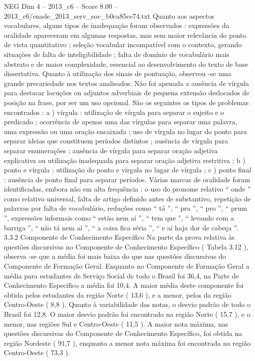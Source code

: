 \begin{textsample}{NEG Dim 4 – 2013\_c6 – Score 8.00 – 2013\_c6/enade\_2013\_serv\_soc\_b0ca85ce74.txt}
Quanto aos aspectos vocabulares, alguns tipos de inadequação foram observados : expressões da oralidade apareceram em algumas respostas, mas sem maior relevância do ponto de vista quantitativo ; seleção vocabular incompatível com o contexto, gerando situações de falta de inteligibilidade ; falta de domínio de vocabulário mais abstrato e de maior complexidade, essencial ao desenvolvimento do texto de base dissertativa.
Quanto à utilização dos sinais de pontuação, observou -se uma grande precariedade nos textos analisados.
Não foi apenada a ausência de vírgula para destacar locuções ou adjuntos adverbiais de pequena extensão deslocados de posição na frase, por ser um uso opcional.
São os seguintes os tipos de problemas encontrados : a ) vírgula : utilização de vírgula para separar o sujeito e o predicado ; ocorrência de apenas uma das vírgulas para separar uma palavra, uma expressão ou uma oração encaixada ; uso de vírgula no lugar do ponto para separar ideias que constituem períodos distintos ; ausência de vírgula para separar enumerações ; ausência de vírgula para separar oração adjetiva explicativa ou utilização inadequada para separar oração adjetiva restritiva ; b ) ponto e vírgula : utilização do ponto e vírgula no lugar de vírgula ; c ) ponto final : ausência de ponto final para separar períodos.
Várias marcas de oralidade foram identificadas, embora não em alta frequência : o uso do pronome relativo “ onde ” como relativo universal, falta de artigo definido antes de substantivo, repetição de palavras por falta de vocabulário, reduções como “ tá ”, “ pra ”, “ pro ”, “ prum ”, expressões informais como “ estão nem aí ”, “ tem que ”, “ levando com a barriga ”, “ não tá nem aí ”, “ a coisa fica séria ”, “ e aí haja dor de cabeça ”. 3.3.2 Componente de Conhecimento Específico Na parte da prova relativa às questões discursivas no Componente de Conhecimento Específico ( Tabela 3.12 ), observa -se que a média foi mais baixa do que nas questões discursivas do Componente de Formação Geral.
Enquanto no Componente de Formação Geral a média para estudantes de Serviço Social de todo o Brasil foi 36,4, na Parte de Conhecimento Específico a média foi 10,4.
A maior média deste componente foi obtida pelos estudantes da região Norte ( 13,6 ), e a menor, pelos da região Centro-Oeste ( 8,8 ).
Quanto à variabilidade das notas, o desvio padrão de todo o Brasil foi 12,8.
O maior desvio padrão foi encontrado na região Norte ( 15,7 ), e o menor, nas regiões Sul e Centro-Oeste ( 11,5 ).
A maior nota máxima, nas questões discursivas do Componente de Conhecimento Específico, foi obtida na região Nordeste ( 91,7 ), enquanto a menor nota máxima foi encontrada na região Centro-Oeste ( 73,3 ).

\end{textsample}
